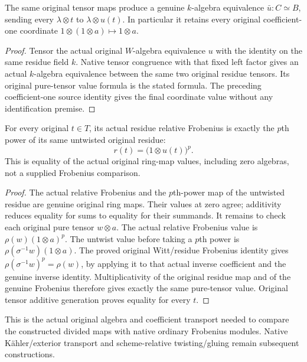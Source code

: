 \begin{theorem}
\label{thm:witt-two-native-residue-untwist}
\leanok
{}
The same original tensor maps produce a genuine $k$-algebra equivalence
$\bar u:C\simeq B$, sending every $\lambda\otimes t$ to
$\lambda\otimes u(t)$. In particular it retains every original
coefficient-one coordinate $1\otimes(1\otimes a)\mapsto1\otimes a$.
\end{theorem}
\begin{proof}
Tensor the actual original $W$-algebra equivalence $u$ with the identity
on the same residue field $k$. Native tensor congruence with that fixed
left factor gives an actual $k$-algebra equivalence between the same
two original residue tensors. Its original pure-tensor value formula
is the stated formula. The preceding coefficient-one source identity
gives the final coordinate value without any identification premise.
\end{proof}

\begin{theorem}
\label{thm:witt-two-residue-frobenius-untwist}
\leanok
{}
For every original $t\in T$, its actual residue relative Frobenius is
exactly the $p$th power of its same untwisted original residue:
\[
 r(t)=\bigl(1\otimes u(t)\bigr)^p.
\]
This is equality of the actual original ring-map values, including zero
algebras, not a supplied Frobenius comparison.
\end{theorem}
\begin{proof}
The actual relative Frobenius and the $p$th-power map of the untwisted
residue are genuine original ring maps. Their values at zero agree;
additivity reduces equality for sums to equality for their summands.
It remains to check each original pure tensor $w\otimes a$.
The actual relative Frobenius value is
$\rho(w)(1\otimes a)^p$. The untwist value before taking a $p$th power
is $\rho(\sigma^{-1}w)(1\otimes a)$. The proved original Witt/residue
Frobenius identity gives
$\rho(\sigma^{-1}w)^p=\rho(w)$, by applying it to that actual inverse
coefficient and the genuine inverse identity. Multiplicativity of the
original residue map and of the genuine Frobenius therefore gives
exactly the same pure-tensor value. Original tensor additive generation
proves equality for every $t$.
\end{proof}

This is the actual original algebra and coefficient transport needed to
compare the constructed divided maps with native ordinary Frobenius modules.
Native Kähler/exterior transport and scheme-relative twisting/gluing remain
subsequent constructions.
